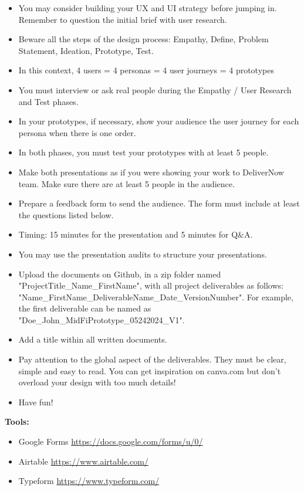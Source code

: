 \begin{itemize}
\item You may consider building your UX and UI strategy before jumping in. Remember to question the initial brief with user research.
\item Beware all the steps of the design process: Empathy, Define, Problem Statement, Ideation, Prototype, Test.
\item In this context, 4 users = 4 personas = 4 user journeys = 4 prototypes
\item You must interview or ask real people during the Empathy / User Research and Test phases.
\item In your prototypes, if necessary, show your audience the user journey for each persona when there is one order.
\item In both phases, you must test your prototypes with at least 5 people.
\item Make both presentations as if you were showing your work to DeliverNow team. Make sure there are at least 5 people in the audience.
\item Prepare a feedback form to send the audience. The form must include at least the questions listed below.
\item Timing: 15 minutes for the presentation and 5 minutes for Q\&A.
\item You may use the presentation audits to structure your presentations.
\item Upload the documents on Github, in a zip folder named "ProjectTitle\_Name\_FirstName", with all project deliverables as follows: "Name\_FirstName\_DeliverableName\_Date\_VersionNumber".  For example, the first deliverable can be named as "Doe\_John\_MidFiPrototype\_05242024\_V1".
\item Add a title within all written documents.
\item Pay attention to the global aspect of the deliverables. They must be clear, simple and easy to read. You can get inspiration on canva.com but don't overload your design with too much details!
\item Have fun!
\end{itemize}

\textbf{Tools:}

\begin{itemize}
\item Google Forms \url{https://docs.google.com/forms/u/0/}
\item Airtable \url{https://www.airtable.com/}
\item Typeform \url{https://www.typeform.com/}
\end{itemize}

